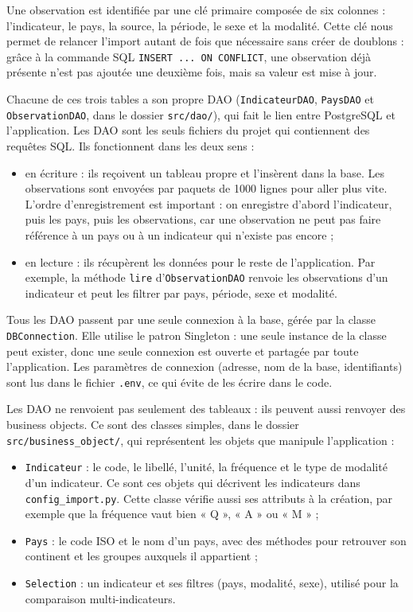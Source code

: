 \documentclass[
  french,
  12pt,
  letterpaper,
  DIV=11,
  numbers=noendperiod]{scrartcl}
\providecommand{\tightlist}{%
  \setlength{\itemsep}{0pt}\setlength{\parskip}{0pt}}
\begin{document}
Une observation est identifiée par une clé primaire composée de six
colonnes : l'indicateur, le pays, la source, la période, le sexe et la
modalité. Cette clé nous permet de relancer l'import autant de fois que
nécessaire sans créer de doublons : grâce à la commande SQL
\texttt{INSERT\ ...\ ON\ CONFLICT}, une observation déjà présente n'est
pas ajoutée une deuxième fois, mais sa valeur est mise à jour.

Chacune de ces trois tables a son propre DAO (\texttt{IndicateurDAO},
\texttt{PaysDAO} et \texttt{ObservationDAO}, dans le dossier
\texttt{src/dao/}), qui fait le lien entre PostgreSQL et l'application.
Les DAO sont les seuls fichiers du projet qui contiennent des requêtes
SQL. Ils fonctionnent dans les deux sens :

\begin{itemize}
\tightlist
\item
  en écriture : ils reçoivent un tableau propre et l'insèrent dans la
  base. Les observations sont envoyées par paquets de 1000 lignes pour
  aller plus vite. L'ordre d'enregistrement est important : on
  enregistre d'abord l'indicateur, puis les pays, puis les observations,
  car une observation ne peut pas faire référence à un pays ou à un
  indicateur qui n'existe pas encore ;
\item
  en lecture : ils récupèrent les données pour le reste de
  l'application. Par exemple, la méthode \texttt{lire}
  d'\texttt{ObservationDAO} renvoie les observations d'un indicateur et
  peut les filtrer par pays, période, sexe et modalité.
\end{itemize}

Tous les DAO passent par une seule connexion à la base, gérée par la
classe \texttt{DBConnection}. Elle utilise le patron Singleton : une
seule instance de la classe peut exister, donc une seule connexion est
ouverte et partagée par toute l'application. Les paramètres de connexion
(adresse, nom de la base, identifiants) sont lus dans le fichier
\texttt{.env}, ce qui évite de les écrire dans le code.

Les DAO ne renvoient pas seulement des tableaux : ils peuvent aussi
renvoyer des business objects. Ce sont des classes simples, dans le
dossier \texttt{src/business\_object/}, qui représentent les objets que
manipule l'application :

\begin{itemize}
\tightlist
\item
  \texttt{Indicateur} : le code, le libellé, l'unité, la fréquence et le
  type de modalité d'un indicateur. Ce sont ces objets qui décrivent les
  indicateurs dans \texttt{config\_import.py}. Cette classe vérifie
  aussi ses attributs à la création, par exemple que la fréquence vaut
  bien « Q », « A » ou « M » ;
\item
  \texttt{Pays} : le code ISO et le nom d'un pays, avec des méthodes
  pour retrouver son continent et les groupes auxquels il appartient ;
\item
  \texttt{Selection} : un indicateur et ses filtres (pays, modalité,
  sexe), utilisé pour la comparaison multi-indicateurs.
\end{itemize}
\end{document}
